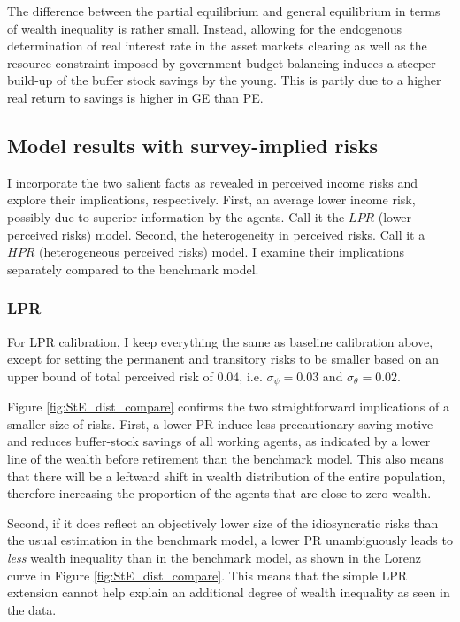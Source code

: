 The difference between the partial equilibrium and general equilibrium in terms of wealth inequality is rather small. Instead, allowing for the endogenous determination of real interest rate in the asset markets clearing as well as the resource constraint imposed by government budget balancing induces a steeper build-up of the buffer stock savings by the young. This is partly due to a higher real return to savings is higher in GE than PE. 

\subsection{Model results with survey-implied risks}

I incorporate the two salient facts as revealed in perceived income risks and explore their implications, respectively. First, an average lower income risk, possibly due to superior information by the agents. Call it the $LPR$ (lower perceived risks) model. Second, the heterogeneity in perceived risks. Call it a $HPR$ (heterogeneous perceived risks) model. I examine their implications separately compared to the benchmark model. 

\subsubsection{LPR}

For LPR calibration, I keep everything the same as baseline calibration above, except for setting the permanent and transitory risks to be smaller based on an upper bound of total perceived risk of $0.04$, i.e. $\sigma_\psi=0.03$ and $\sigma_\theta=0.02$. 

Figure \ref{fig:StE_dist_compare} confirms the two straightforward implications of a smaller size of risks. First, a lower PR induce less precautionary saving motive and reduces buffer-stock savings of all working agents, as indicated by a lower line of the wealth before retirement than the benchmark model. This also means that there will be a leftward shift in wealth distribution of the entire population, therefore increasing the proportion of the agents that are close to zero wealth. 

Second, if it does reflect an objectively lower size of the idiosyncratic risks than the usual estimation in the benchmark model, a lower PR unambiguously leads to \emph{less} wealth inequality than in the benchmark model, as shown in the Lorenz curve in Figure \ref{fig:StE_dist_compare}. This means that the simple LPR extension cannot help explain an additional degree of wealth inequality as seen in the data.


